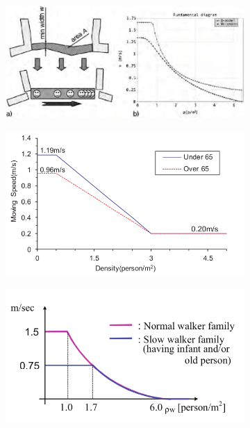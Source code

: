 \begin{figure}[ht]
    \centering
    \begin{subfigure}{0.45\textwidth}
        \includegraphics[width=\textwidth]{images/speed_lammel.png}
        \caption{}
        \label{fig:speed-lammel}
    \end{subfigure}
    \hfill
    \begin{subfigure}{0.45\textwidth}
        \includegraphics[width=\textwidth]{images/speed_Linear.png}
        \caption{}
        \label{fig:speed-linear}
    \end{subfigure}
    \begin{subfigure}{0.45\textwidth}
        \includegraphics[width=\textwidth]{images/speed_GOTO.png}

\end{subfigure}
\end{figure}
